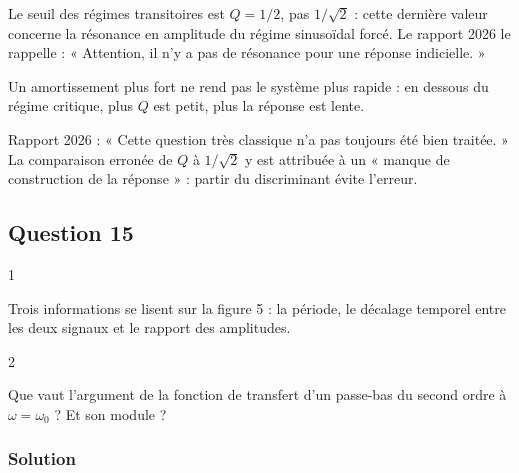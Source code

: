 \documentclass[11pt,a4paper]{article}
\begin{document}
\begin{piege}

Le seuil des régimes transitoires est \(Q=1/2\), pas \(1/\sqrt2\) : cette dernière valeur concerne la résonance en amplitude du régime sinusoïdal forcé. Le rapport 2026 le rappelle : « Attention, il n'y a pas de résonance pour une réponse indicielle. »

\end{piege}

\begin{piege}

Un amortissement plus fort ne rend pas le système plus rapide : en dessous du régime critique, plus \(Q\) est petit, plus la réponse est lente.

\end{piege}

\begin{jury}

Rapport 2026 : « Cette question très classique n'a pas toujours été bien traitée. » La comparaison erronée de \(Q\) à \(1/\sqrt2\) y est attribuée à un « manque de construction de la réponse » : partir du discriminant évite l'erreur.

\end{jury}

\hypertarget{question-15}{%
\subsection{Question 15}\label{question-15}}

\begin{indication}{1}

Trois informations se lisent sur la figure 5 : la période, le décalage temporel entre les deux signaux et le rapport des amplitudes.

\end{indication}

\begin{indication}{2}

Que vaut l'argument de la fonction de transfert d'un passe-bas du second ordre à \(\omega=\omega_0\) ? Et son module ?

\end{indication}

\hypertarget{solution-14}{%
\subsubsection{Solution}\label{solution-14}}
\end{document}
